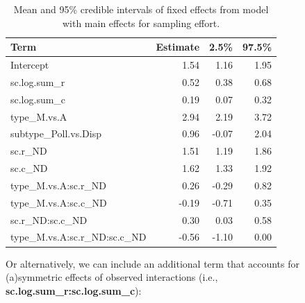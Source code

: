 \documentclass[11pt,]{article}
\begin{document}
\begin{table}[!h]

\caption{\label{tab:subset-sampling-table}Mean and 95\% credible intervals of fixed effects from model with main effects for sampling effort.}
\centering
\begin{tabular}{lrrr}
\toprule
Term & Estimate & 2.5\% & 97.5\%\\
\midrule
\rowcolor{gray!6}  Intercept & 1.54 & 1.16 & 1.95\\
sc.log.sum\_r & 0.52 & 0.38 & 0.68\\
\rowcolor{gray!6}  sc.log.sum\_c & 0.19 & 0.07 & 0.32\\
type\_M.vs.A & 2.94 & 2.19 & 3.72\\
\rowcolor{gray!6}  subtype\_Poll.vs.Disp & 0.96 & -0.07 & 2.04\\
sc.r\_ND & 1.51 & 1.19 & 1.86\\
\rowcolor{gray!6}  sc.c\_ND & 1.62 & 1.33 & 1.92\\
type\_M.vs.A:sc.r\_ND & 0.26 & -0.29 & 0.82\\
\rowcolor{gray!6}  type\_M.vs.A:sc.c\_ND & -0.19 & -0.71 & 0.35\\
sc.r\_ND:sc.c\_ND & 0.30 & 0.03 & 0.58\\
\rowcolor{gray!6}  type\_M.vs.A:sc.r\_ND:sc.c\_ND & -0.56 & -1.10 & 0.00\\
\bottomrule
\end{tabular}
\end{table}

Or alternatively, we can include an additional term that accounts for
(a)symmetric effects of observed interactions (i.e.,
\textbf{sc.log.sum\_r:sc.log.sum\_c}):
\end{document}
